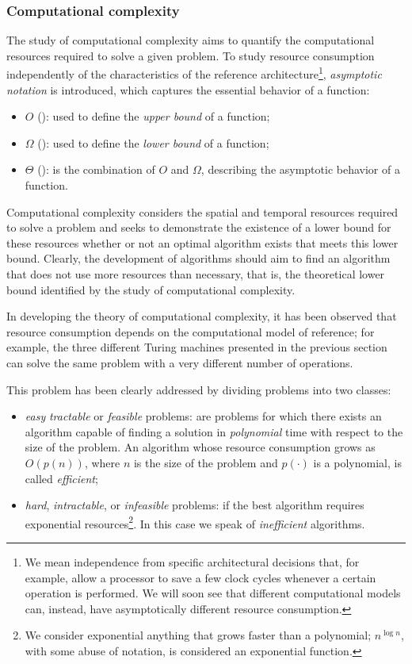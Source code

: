 \subsubsection*{Computational complexity}
The study of computational complexity aims to quantify the computational resources required to solve a given problem. To study resource consumption independently of the characteristics of the reference architecture\footnote{We mean independence from specific architectural decisions that, for example, allow a processor to save a few clock cycles whenever a certain operation is performed. We will soon see that different computational models can, instead, have asymptotically different resource consumption.}, \emph{asymptotic notation} is introduced, which captures the essential behavior of a function:
\begin{itemize}
	\item $O$ (): used to define the \emph{upper bound} of a function;
	\item $\Omega$ (): used to define the \emph{lower bound} of a function;
	\item $\Theta$ (): is the combination of $O$ and $\Omega$, describing the asymptotic behavior of a function.
\end{itemize}

Computational complexity considers the spatial and temporal resources required to solve a problem and seeks to demonstrate the existence of a lower bound for these resources whether or not an optimal algorithm exists that meets this lower bound. Clearly, the development of algorithms should aim to find an algorithm that does not use more resources than necessary, that is, the theoretical lower bound identified by the study of computational complexity.

In developing the theory of computational complexity, it has been observed that resource consumption depends on the computational model of reference; for example, the three different Turing machines presented in the previous section can solve the same problem with a very different number of operations.

This problem has been clearly addressed by dividing problems into two classes:
\begin{itemize}
	\item \emph{easy} \emph{tractable} or \emph{feasible} problems: are problems for which there exists an algorithm capable of finding a solution in \emph{polynomial} time with respect to the size of the problem. An algorithm whose resource consumption grows as $O(p(n))$, where $n$ is the size of the problem and $p(\cdot)$ is a polynomial, is called \emph{efficient};
	\item \emph{hard}, \emph{intractable}, or \emph{infeasible} problems: if the best algorithm requires exponential resources\footnote{We consider exponential anything that grows faster than a polynomial; $n^{\log n}$, with some abuse of notation, is considered an exponential function.}. In this case we speak of \emph{inefficient} algorithms.
\end{itemize}

